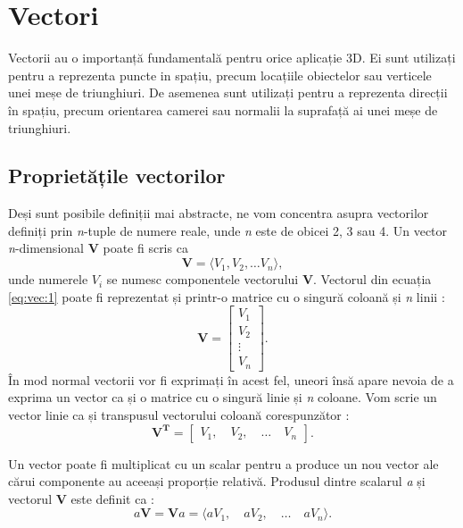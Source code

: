 \section{Vectori}
\label{ch1:sec_vectors}
\indent

Vectorii au o importanță fundamentală pentru orice aplicație 3D. Ei sunt
utilizați pentru a reprezenta puncte in spațiu, precum locațiile obiectelor sau
verticele unei meșe de triunghiuri. De asemenea sunt utilizați pentru a
reprezenta direcții în spațiu, precum orientarea camerei sau normalii la
suprafață ai unei meșe de triunghiuri.

\subsection{Proprietățile vectorilor}
\label{ch1:sec_vectors:sub_properties}
\indent 

Deși sunt posibile definiții mai abstracte, ne vom concentra asupra vectorilor
definiți prin \textit{n}-tuple de numere reale, unde \textit{n} este de obicei
2, 3 sau 4. Un vector \textit{n}-dimensional \textbf{V} poate fi scris ca
\begin{equation}
\label{eq:vec:1}
\mathbf{V} = \langle V_1, V_2, \dots V_n \rangle,
\end{equation}  unde numerele $\mathit{V_i}$ se numesc componentele vectorului
\textbf{V}.
Vectorul din ecuația \eqref{eq:vec:1} poate fi reprezentat și printr-o matrice
cu o singură coloană și \textit{n} linii :
\begin{equation}
\label{eq:vec:2}
\mathbf{V} = 
\begin{bmatrix}
V_1 \\
V_2 \\
\vdots \\
V_n
\end{bmatrix}.
\end{equation} 
În mod normal vectorii vor fi exprimați în acest fel, uneori însă apare nevoia
de a exprima un vector ca și o matrice cu o singură linie și \textit{n} coloane.
Vom scrie un vector linie ca și transpusul vectorului coloană corespunzător :
\begin{equation}
\label{eq:vec:3}
\mathbf{V^T} = 
\begin{bmatrix}
V_1, \quad V_2, \quad \dots \quad V_n
\end{bmatrix}.
\end{equation}

\indent
 Un vector poate fi multiplicat cu un scalar pentru a produce un
nou vector ale cărui componente au aceeași proporție relativă. Produsul dintre
scalarul \textit{a} și vectorul \textbf{V} este definit ca :
\begin{equation}
\label{eq:vec:4}
\mathit{a}\mathbf{V} = \mathbf{V}\mathit{a} = \langle \mathit{a}V_1, \quad
\mathit{a}V_2, \quad \dots \quad \mathit{a}V_n \rangle.
\end{equation}

